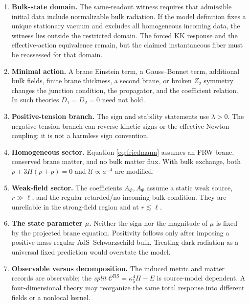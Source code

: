 \documentclass[11pt,a4paper]{article}
\theoremstyle{plain}
\theoremstyle{definition}
\newcommand{\kfive}{\kappa_5}
\newcommand{\RS}{\mathrm{RS}}
\begin{document}
\begin{enumerate}[leftmargin=*]
\item \textbf{Bulk-state domain.} The same-readout witness requires that
admissible initial data include normalizable bulk radiation. If the model
definition fixes a unique stationary vacuum and excludes all homogeneous
incoming data, the witness lies outside the restricted domain. The forced
KK response and the effective-action equivalence remain, but the claimed
instantaneous fiber must be reassessed for that domain.

\item \textbf{Minimal action.} A brane Einstein term, a Gauss--Bonnet
term, additional bulk fields, finite brane thickness, a second brane, or
broken $Z_2$ symmetry changes the junction condition, the propagator, and
the coefficient relation. In such theories $D_1=D_2=0$ need not hold.

\item \textbf{Positive-tension branch.} The sign and stability statements
use $\lambda>0$. The negative-tension branch can reverse kinetic signs or
the effective Newton coupling; it is not a harmless sign convention.

\item \textbf{Homogeneous sector.} Equation \eqref{eq:friedmann} assumes
an FRW brane, conserved brane matter, and no bulk matter flux. With bulk
exchange, both $\dot\rho+3H(\rho+p)=0$ and $\mathcal U\propto a^{-4}$ are
modified.

\item \textbf{Weak-field sector.} The coefficients $A_\Phi,A_\Psi$ assume
a static weak source, $r\gg\ell$, and the regular retarded/no-incoming
bulk condition. They are unreliable in the strong-field region and at
$r\lesssim\ell$.

\item \textbf{The state parameter $\mu$.} Neither the sign nor the
magnitude of $\mu$ is fixed by the projected brane equation. Positivity
follows only after imposing a positive-mass regular AdS--Schwarzschild
bulk. Treating dark radiation as a universal fixed prediction would
overstate the model.

\item \textbf{Observable versus decomposition.} The induced metric and
matter records are observable; the \emph{split}
$\mathcal C^{\RS}=\kfive^4\Pi-E$ is source-model dependent. A
four-dimensional theory may reorganize the same total response into
different fields or a nonlocal kernel.


\end{enumerate}
\end{document}
